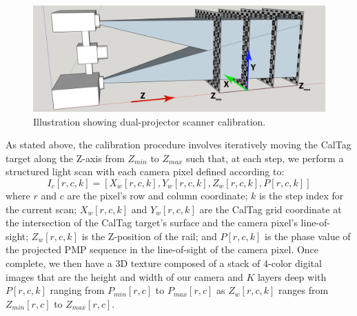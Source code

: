 \documentclass[]{spie}  %
\begin{document}
\begin{figure}
\centerline{\includegraphics[width=6.6in]{Figures/SLICalibrationDual}}
\vspace{0.1in}
\caption{Illustration showing dual-projector scanner calibration.}
\label{Fig:20}
\end{figure} 

As stated above, the calibration procedure involves iteratively moving the CalTag target along the Z-axis from $Z_{min}$ to $Z_{max}$ such that, at each step, we perform a structured light scan with each camera pixel defined according to:
\begin{equation}
I_c[r,c,k] = [X_w[r,c,k], Y_w[r,c,k], Z_w[r,c,k], P[r,c,k]]
\label{calEqn}
\end{equation}
where $r$ and $c$ are the pixel’s row and column coordinate; $k$ is the step index for the current scan; $X_w[r,c,k]$ and $Y_w[r,c,k]$ are the CalTag grid coordinate at the intersection of the CalTag target’s surface and the camera pixel’s line-of-sight; $Z_w[r,c,k]$ is the Z-position of the rail; and $P[r,c,k]$ is the phase value of the projected PMP sequence in the line-of-sight of the camera pixel.  Once complete, we then have a 3D texture composed of a stack of 4-color digital images that are the height and width of our camera and $K$ layers deep with $P[r,c,k]$ ranging from $P_{min}[r,c]$ to $P_{max}[r,c]$ as $Z_w[r,c,k]$ ranges from $Z_{min}[r,c]$ to $Z_{max}[r,c]$.
\end{document}
